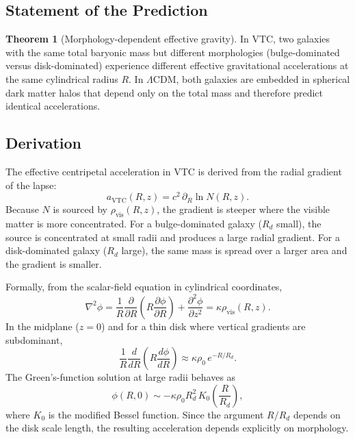 \documentclass[11pt,a4paper]{article}
\theoremstyle{definition}
\newtheorem{theorem}{Theorem}[section]
\newcommand{\vis}{\mathrm{vis}}
\newcommand{\VTC}{\mathrm{VTC}}
\begin{document}
\subsection{Statement of the Prediction}

\begin{theorem}[Morphology-dependent effective gravity]
In VTC, two galaxies with the same total baryonic mass but different morphologies (bulge-dominated versus disk-dominated) experience different effective gravitational accelerations at the same cylindrical radius $R$. In $\Lambda$CDM, both galaxies are embedded in spherical dark matter halos that depend only on the total mass and therefore predict identical accelerations.
\end{theorem}

\subsection{Derivation}

The effective centripetal acceleration in VTC is derived from the radial gradient of the lapse:
\begin{equation}
    a_{\VTC}(R,z) = c^2\,\partial_R\ln N(R,z).
\end{equation}
Because $N$ is sourced by $\rho_{\vis}(R,z)$, the gradient is steeper where the visible matter is more concentrated. For a bulge-dominated galaxy ($R_d$ small), the source is concentrated at small radii and produces a large radial gradient. For a disk-dominated galaxy ($R_d$ large), the same mass is spread over a larger area and the gradient is smaller.

Formally, from the scalar-field equation in cylindrical coordinates,
\begin{equation}
    \nabla^2\phi = \frac{1}{R}\frac{\partial}{\partial R}\!\left(R\frac{\partial\phi}{\partial R}\right) + \frac{\partial^2\phi}{\partial z^2} = \kappa\rho_{\vis}(R,z).
\end{equation}
In the midplane ($z=0$) and for a thin disk where vertical gradients are subdominant,
\begin{equation}
    \frac{1}{R}\frac{d}{dR}\!\left(R\frac{d\phi}{dR}\right) \approx \kappa\rho_0\,e^{-R/R_d}.
\end{equation}
The Green's-function solution at large radii behaves as
\begin{equation}
    \phi(R,0) \sim -\kappa\rho_0 R_d^2\,K_0\!\left(\frac{R}{R_d}\right),
\end{equation}
where $K_0$ is the modified Bessel function. Since the argument $R/R_d$ depends on the disk scale length, the resulting acceleration depends explicitly on morphology.
\end{document}
